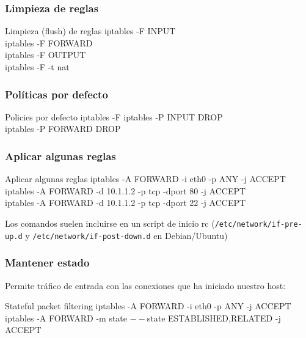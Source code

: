 \documentclass{beamer}
\begin{document}

\begin{frame}
\frametitle{Limpieza de reglas}

\begin{block}{Limpieza (flush) de reglas}
iptables -F INPUT \\
iptables -F FORWARD \\
iptables -F OUTPUT \\
iptables -F -t nat
\end{block}

\end{frame}



\begin{frame}
\frametitle{Políticas por defecto}

\begin{block}{Policies por defecto}
iptables -F 
iptables -P INPUT DROP \\
iptables -P FORWARD DROP  \\
\end{block}

\end{frame}


\begin{frame}
\frametitle{Aplicar algunas reglas}

\begin{block}{Aplicar algunas reglas}
iptables -A FORWARD -i eth0 -p ANY -j ACCEPT  \\
iptables -A FORWARD -d 10.1.1.2 -p tcp -dport 80 -j ACCEPT \\
iptables -A FORWARD -d 10.1.1.2 -p tcp -dport 22 -j ACCEPT   \\
\end{block}

Los comandos suelen incluirse en un script de inicio rc (\texttt{/etc/network/if-pre-up.d} y \texttt{/etc/network/if-post-down.d} en Debian/Ubuntu)

\end{frame}


\begin{frame}
\frametitle{Mantener estado}

Permite tráfico de entrada con las conexiones que ha iniciado nuestro host:

\begin{block}{Stateful packet filtering}
iptables -A FORWARD -i eth0 -p ANY -j ACCEPT  \\
iptables -A FORWARD -m state $--$state ESTABLISHED,RELATED -j ACCEPT \\
\end{block}

\end{frame}
\end{document}
